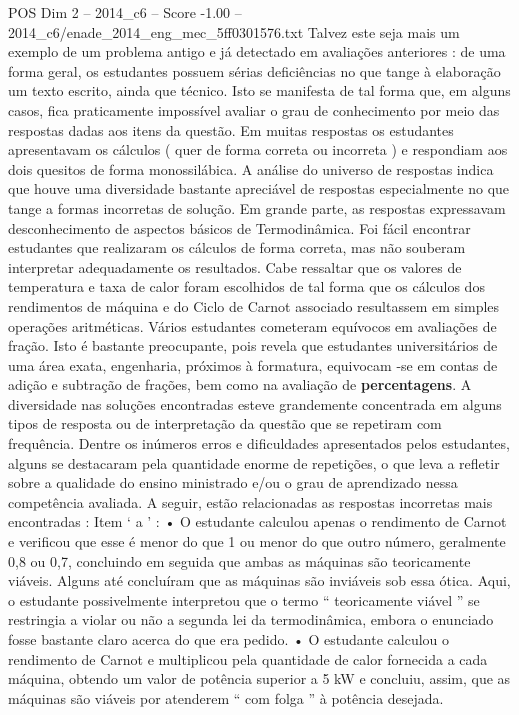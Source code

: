 \begin{textsample}{POS Dim 2 – 2014\_c6 – Score -1.00 – 2014\_c6/enade\_2014\_eng\_mec\_5ff0301576.txt}
Talvez este seja mais um exemplo de um problema antigo e já detectado em avaliações anteriores : de uma forma geral, os estudantes possuem sérias deficiências no que tange à elaboração um texto escrito, ainda que técnico.
Isto se manifesta de tal forma que, em alguns casos, fica praticamente impossível avaliar o grau de conhecimento por meio das respostas dadas aos itens da questão.
Em muitas respostas os estudantes apresentavam os cálculos ( quer de forma correta ou incorreta ) e respondiam aos dois quesitos de forma monossilábica.
A análise do universo de respostas indica que houve uma diversidade bastante apreciável de respostas especialmente no que tange a formas incorretas de solução.
Em grande parte, as respostas expressavam desconhecimento de aspectos básicos de Termodinâmica.
Foi fácil encontrar estudantes que realizaram os cálculos de forma correta, mas não souberam interpretar adequadamente os resultados.
Cabe ressaltar que os valores de temperatura e taxa de calor foram escolhidos de tal forma que os cálculos dos rendimentos de máquina e do Ciclo de Carnot associado resultassem em simples operações aritméticas.
Vários estudantes cometeram equívocos em avaliações de fração.
Isto é bastante preocupante, pois revela que estudantes universitários de uma área exata, engenharia, próximos à formatura, equivocam -se em contas de adição e subtração de frações, bem como na avaliação de \textbf{percentagens}.
A diversidade nas soluções encontradas esteve grandemente concentrada em alguns tipos de resposta ou de interpretação da questão que se repetiram com frequência.
Dentre os inúmeros erros e dificuldades apresentados pelos estudantes, alguns se destacaram pela quantidade enorme de repetições, o que leva a refletir sobre a qualidade do ensino ministrado e/ou o grau de aprendizado nessa competência avaliada.
A seguir, estão relacionadas as respostas incorretas mais encontradas : Item ‘ a ’ : • O estudante calculou apenas o rendimento de Carnot e verificou que esse é menor do que 1 ou menor do que outro número, geralmente 0,8 ou 0,7, concluindo em seguida que ambas as máquinas são teoricamente viáveis.
Alguns até concluíram que as máquinas são inviáveis sob essa ótica.
Aqui, o estudante possivelmente interpretou que o termo “ teoricamente viável ” se restringia a violar ou não a segunda lei da termodinâmica, embora o enunciado fosse bastante claro acerca do que era pedido. • O estudante calculou o rendimento de Carnot e multiplicou pela quantidade de calor fornecida a cada máquina, obtendo um valor de potência superior a 5 kW e concluiu, assim, que as máquinas são viáveis por atenderem “ com folga ” à potência desejada.

\end{textsample}
